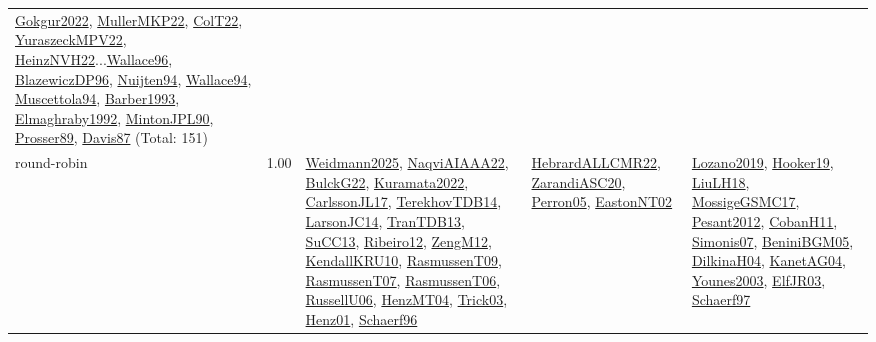 {\begin{longtable}{p{3cm}r>{\raggedright\arraybackslash}p{6cm}>{\raggedright\arraybackslash}p{6cm}>{\raggedright\arraybackslash}p{8cm}}
\hyperref[detail:Gokgur2022]{Gokgur2022}, \hyperref[detail:MullerMKP22]{MullerMKP22}, \hyperref[detail:ColT22]{ColT22}, \hyperref[detail:YuraszeckMPV22]{YuraszeckMPV22}, \hyperref[detail:HeinzNVH22]{HeinzNVH22}...\hyperref[detail:Wallace96]{Wallace96}, \hyperref[detail:BlazewiczDP96]{BlazewiczDP96}, \hyperref[detail:Nuijten94]{Nuijten94}, \hyperref[detail:Wallace94]{Wallace94}, \hyperref[detail:Muscettola94]{Muscettola94}, \hyperref[detail:Barber1993]{Barber1993}, \hyperref[detail:Elmaghraby1992]{Elmaghraby1992}, \hyperref[detail:MintonJPL90]{MintonJPL90}, \hyperref[detail:Prosser89]{Prosser89}, \hyperref[detail:Davis87]{Davis87} (Total: 151)\\
\index{round-robin}\index{ApplicationAreas!round-robin}round-robin &  1.00 & \hyperref[detail:Weidmann2025]{Weidmann2025}, \hyperref[detail:NaqviAIAAA22]{NaqviAIAAA22}, \hyperref[detail:BulckG22]{BulckG22}, \hyperref[detail:Kuramata2022]{Kuramata2022}, \hyperref[detail:CarlssonJL17]{CarlssonJL17}, \hyperref[detail:TerekhovTDB14]{TerekhovTDB14}, \hyperref[detail:LarsonJC14]{LarsonJC14}, \hyperref[detail:TranTDB13]{TranTDB13}, \hyperref[detail:SuCC13]{SuCC13}, \hyperref[detail:Ribeiro12]{Ribeiro12}, \hyperref[detail:ZengM12]{ZengM12}, \hyperref[detail:KendallKRU10]{KendallKRU10}, \hyperref[detail:RasmussenT09]{RasmussenT09}, \hyperref[detail:RasmussenT07]{RasmussenT07}, \hyperref[detail:RasmussenT06]{RasmussenT06}, \hyperref[detail:RussellU06]{RussellU06}, \hyperref[detail:HenzMT04]{HenzMT04}, \hyperref[detail:Trick03]{Trick03}, \hyperref[detail:Henz01]{Henz01}, \hyperref[detail:Schaerf96]{Schaerf96} & \hyperref[detail:HebrardALLCMR22]{HebrardALLCMR22}, \hyperref[detail:ZarandiASC20]{ZarandiASC20}, \hyperref[detail:Perron05]{Perron05}, \hyperref[detail:EastonNT02]{EastonNT02} & \hyperref[detail:Lozano2019]{Lozano2019}, \hyperref[detail:Hooker19]{Hooker19}, \hyperref[detail:LiuLH18]{LiuLH18}, \hyperref[detail:MossigeGSMC17]{MossigeGSMC17}, \hyperref[detail:Pesant2012]{Pesant2012}, \hyperref[detail:CobanH11]{CobanH11}, \hyperref[detail:Simonis07]{Simonis07}, \hyperref[detail:BeniniBGM05]{BeniniBGM05}, \hyperref[detail:DilkinaH04]{DilkinaH04}, \hyperref[detail:KanetAG04]{KanetAG04}, \hyperref[detail:Younes2003]{Younes2003}, \hyperref[detail:ElfJR03]{ElfJR03}, \hyperref[detail:Schaerf97]{Schaerf97}\\

\end{longtable}}
